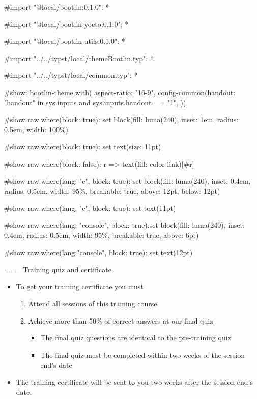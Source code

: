 #import "@local/bootlin:0.1.0": *

#import "@local/bootlin-yocto:0.1.0": *

#import "@local/bootlin-utils:0.1.0": *

#import "../../typst/local/themeBootlin.typ": *

#import "../../typst/local/common.typ": *

#show: bootlin-theme.with( aspect-ratio: "16-9", config-common(handout: "handout" in sys.inputs and sys.inputs.handout == "1", ))

#show raw.where(block: true): set block(fill: luma(240), inset: 1em, radius: 0.5em, width: 100\%)

#show raw.where(block: true): set text(size: 11pt)

#show raw.where(block: false): r => text(fill: color-link)[#r]

#show raw.where(lang: "c", block: true): set block(fill: luma(240), inset: 0.4em, radius: 0.5em, width: 95\%, breakable: true, above: 12pt, below: 12pt)

#show raw.where(lang: "c", block: true): set text(11pt)

#show raw.where(lang: "console", block: true):set block(fill: luma(240), inset: 0.4em, radius: 0.5em, width: 95\%, breakable: true, above: 6pt)

#show raw.where(lang:"console", block: true): set text(12pt)

=== Training quiz and certificate
\begin{itemize}
\item To get your training certificate you must
  \begin{enumerate}
  \item Attend all sessions of this training course
  \item Achieve more than 50\% of correct answers at our final quiz
    \begin{itemize}
    \item The final quiz questions are identical to the pre-training
      quiz
    \item The final quiz must be completed within two weeks of the
      session end's date
    \end{itemize}
  \end{enumerate}
\item The training certificate will be sent to you two weeks after the
  session end's date.
\end{itemize}


